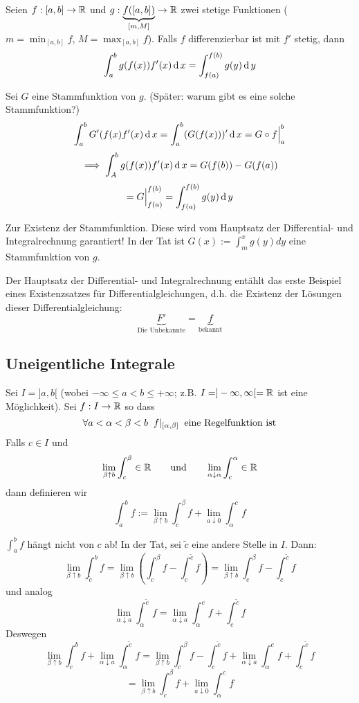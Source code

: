 \begin{Sat}[Substitutionsregel]
  Seien $f:[a,b]\to\mathbb{R}$ und $g:\underbrace{f([a,b])}_{[m,M]}\to\mathbb{R}$ zwei stetige Funktionen ($m=\min_{[a,b]}f$, $M=\max_{[a,b]}f$). Falls $f$ differenzierbar ist mit $f'$ stetig, dann
  \[\int_a^bg(f(x))f'(x)\operatorname{d} x=\int_{f(a)}^{f(b)}g(y)\operatorname{d} y\]
\end{Sat}
\begin{Bew}
  Sei $G$ eine Stammfunktion von $g$. (Später: warum gibt es eine solche Stammfunktion?)
  \[\int_a^bG'(f(x)f'(x)\operatorname{d} x=\int_a^b(G(f(x)))'\operatorname{d} x=G\circ f\Big|_a^b\]
  \[\implies \int_A^bg(f(x))f'(x)\operatorname{d} x=G(f(b))-G(f(a))\]
  \[=G\Big|_{f(a)}^{f(b)}=\int_{f(a)}^{f(b)}g(y)\operatorname{d} y\]

  Zur Existenz der Stammfunktion. Diese wird vom Hauptsatz der Differential- und Integralrechnung
garantiert! In der Tat ist $G(x):= \int_m^x g(y) dy$ eine Stammfunktion von $g$.
\end{Bew}
\begin{Bem} Der Hauptsatz der Differential- und Integralrechnung ent\"ahlt das erste
Beispiel eines Existenzsatzes f\"ur Differentialgleichungen, d.h.
die Existenz der Lösungen dieser Differentialgleichung:
  \[\underbrace{F'}_{\text{Die Unbekannte}}=\underbrace{f}_{\text{bekannt}}\]
\end{Bem}
\subsection{Uneigentliche Integrale}
\begin{Def}
  Sei $I=]a,b[$ (wobei $-\infty\leq a<b\leq +\infty$; z.B. $I=]-\infty,\infty[=\mathbb{R}$ ist eine
M\"oglichkeit). Sei $f:I\to\mathbb{R}$ so dass
  \[\forall a<\alpha<\beta<b\hspace{2mm} f|_{[\alpha,\beta]}\hspace{2mm}\text{eine Regelfunktion ist}\]
  Falls $c\in I$ und
  \[\lim_{\beta\uparrow b}\int_c^\beta\in\mathbb{R}\qquad \mbox{und}\qquad
\lim_{\alpha\downarrow \alpha}\int_c^\alpha\in\mathbb{R}\]
  dann definieren wir
  \[\int_a^bf:=\lim_{\beta\uparrow b}\int_c^\beta f+\lim_{a\downarrow 0}\int_\alpha^cf\]
\end{Def}
\begin{Bem} $\int_a^b f$ h\"angt nicht von $c$ ab! In der Tat, sei $\tilde{c}$ eine andere
 Stelle in $I$. Dann:
\[\lim_{\beta\uparrow b}\int_{\tilde c}^bf
=\lim_{\beta\uparrow b}\left( \int_c^\beta f-\int_c^{\tilde c}f \right)
=\lim_{\beta\uparrow b}\int_c^\beta f-\int_c^{\tilde c}f\]
und analog  
\[\lim_{\alpha\downarrow a}\int_\alpha^{\tilde c}f=
\lim_{\alpha\downarrow a}\int_\alpha^c f+\int_c^{\tilde c}f\]
Deswegen
\[
\lim_{\beta\uparrow b}\int_{\tilde c}^bf +  \lim_{\alpha\downarrow a}\int_\alpha^{\tilde c}f
 =\lim_{\beta\uparrow b}\int_c^\beta f-\int_c^{\tilde c}f + \lim_{\alpha\downarrow a}\int_\alpha^c f+\int_c^{\tilde c}f
\]
\[
 =\lim_{\beta\uparrow b}\int_c^\beta f+\lim_{a\downarrow 0}\int_\alpha^cf
\]


\end{Bem}